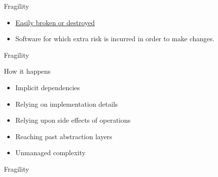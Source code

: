 \documentclass[xcolor=svgnames]{beamer}
\begin{document}
{%
%
\begin{frame}{Fragility}

    \begin{itemize}
        \item \href{https://www.merriam-webster.com/dictionary/fragile}
            {Easily broken or destroyed}
        \item<2-> Software for which extra risk is incurred in order to make
            changes.
    \end{itemize}
\end{frame}
}


{%
%
\begin{frame}{Fragility}

    How it happens
    \begin{itemize}
        \item<1-> Implicit dependencies
        \item<2-> Relying on implementation details
        \item<3-> Relying upon side effects of operations
        \item<4-> Reaching past abstraction layers
        \item<5-> Unmanaged complexity
    \end{itemize}
\end{frame}
}


{%
%
\begin{frame}{Fragility}
    \begin{minipage}{\columnwidth}
    \end{minipage}
\end{frame}
}

\end{document}

